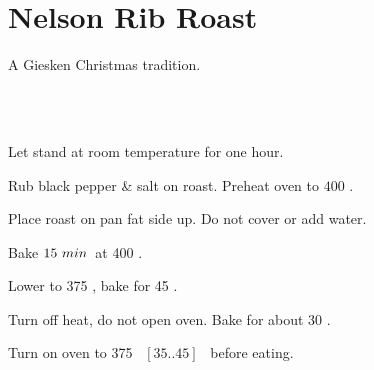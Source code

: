 \section{Nelson Rib Roast}

\begin{recipestats}[
        servings=$2\;person \; / \; 1 \; lb$,
        preptime=1~\onefourth~\hour,
        bakingtime=2~\onefourth~\hour,
        source=Ralph Nelson (Fa),
    ]
\end{recipestats}


\begin{recipeabstract}
    A Giesken Christmas tradition.
\end{recipeabstract}

\begin{ingredientcolumns}[1]
    \begin{ingredientblock}
        \\
        \\
    \end{ingredientblock}
\end{ingredientcolumns}

\begin{preparation}
\item Let stand at room temperature for one hour.

\item Rub black pepper \& salt on roast. Preheat oven to $400$ \Fahrenheit.

\item Place roast on pan fat side up. Do not cover or add water.

\item Bake $15~\minute$~at 400 \Fahrenheit.

\item Lower to 375 \Fahrenheit, bake for 45 \minute.

\item Turn off heat, do not open oven. Bake for about 30 \minute.

\item Turn on oven to 375 \Fahrenheit~$[35..45]$ \minute~before eating.
\end{preparation}

\recipeend%

